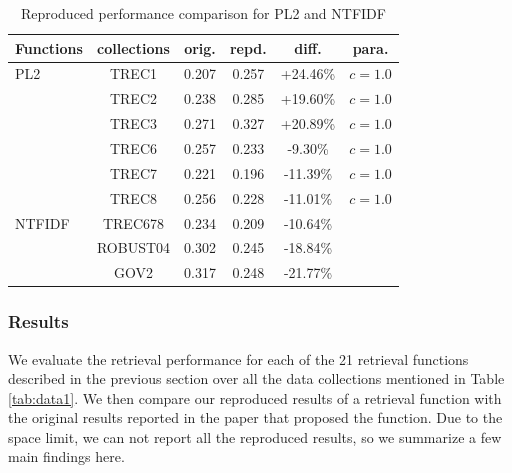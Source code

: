 \begin{table}[t]
\caption{Reproduced performance comparison for PL2 and NTFIDF\label{tab:r1_details_pl2_ntfidf}}
\centering
\small
\begin{tabular}{ |l|c|c|c|c|c| } \hline
\textbf{Functions} & \textbf{collections} & \textbf{orig.} & \textbf{repd.} & \textbf{diff.} & \textbf{para.} \\ \hline \hline
PL2 & TREC1 & 0.207 & 0.257 & +24.46\% & $c=1.0$ \\ \cline{2-6}
 & TREC2 & 0.238 & 0.285 & +19.60\% & $c=1.0$ \\ \cline{2-6}
 & TREC3 & 0.271 & 0.327 & +20.89\% & $c=1.0$ \\ \cline{2-6}
 & TREC6 & 0.257 & 0.233 & -9.30\% & $c=1.0$ \\ \cline{2-6}
 & TREC7 & 0.221 & 0.196 & -11.39\% & $c=1.0$ \\ \cline{2-6}
 & TREC8 & 0.256 & 0.228 & -11.01\% & $c=1.0$ \\ \hline \hline 
NTFIDF & TREC678 & 0.234 & 0.209 & -10.64\% & \\ \cline{2-6}
 & ROBUST04 & 0.302 & 0.245 & -18.84\% & \\ \cline{2-6}
 & GOV2 & 0.317 & 0.248 & -21.77\% & \\ \hline
\end{tabular}
\end{table}



\subsubsection{Results} 

We evaluate the retrieval performance for each of the 21 retrieval functions 
described in the previous section over all the data collections mentioned in 
Table \ref{tab:data1}. We then compare our reproduced results of a retrieval 
function with the original results reported in the paper that proposed the 
function. Due to the space limit, we can not report all the reproduced results, 
so we summarize a few main findings here. 

